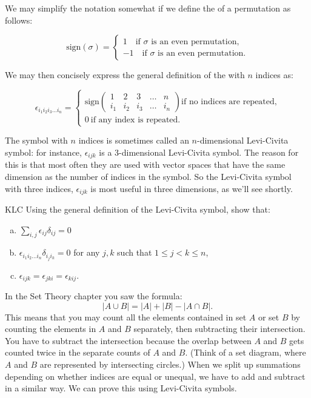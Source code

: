 We may simplify the notation somewhat if we define the  of a permutation as follows:

\[ \text{sign}(\sigma)=
\begin{cases}
1 \quad \text{if } \sigma \text{ is an even permutation,}\\
-1 \quad \text{if } \sigma \text{ is an even permutation.}
\end{cases} \]

We may then concisely express the general definition  of the  with $n$ indices as:

\[ \epsilon_{i_1 i_2 i_3 \ldots i_n}=
\begin{cases}
\text{sign} \left( \begin{smallmatrix} 1&2&3&\ldots&n \\ i_1&i_2&i_3 &\ldots&i_n \end{smallmatrix} \right) \text{if no indices are repeated,}\\
0 ~ \text{if any  index is repeated.}
\end{cases} \]

The symbol with $n$ indices is sometimes called an $n$-dimensional Levi-Civita symbol: for instance, $\epsilon_{ijk}$ is a 3-dimensional Levi-Civita symbol.  The reason for this is that most often they are used with vector spaces that have the same dimension as the number of indices in the symbol.  So   the Levi-Civita symbol with three indices, $\epsilon_{ijk}$ is most useful in three dimensions, as we'll see shortly.

\begin{exercise}{KLC}
Using  the general definition of the Levi-Civita symbol, show that:
\begin{enumerate}[(a)]
\item
$\displaystyle \sum_{i,j} \epsilon_{ij} \delta_{ij}=0$
\item
$ \epsilon_{i_1i_2\ldots i_n} \delta_{i_ji_k}=0$ for any $j,k$ such that $1 \le j < k \le n$,
\item
$\epsilon_{ijk} = \epsilon_{jki} = \epsilon_{kij}.$
\end{enumerate}
\end{exercise}

In the Set Theory chapter you saw the formula:
\[ |A \cup B| = |A| + |B| - |A \cap B|.\]
This means that you may count all the elements contained in set $A$ or set $B$ by counting the elements in $A$ and $B$ separately, then subtracting their intersection.  You have to  subtract the intersection because  the overlap between $A$ and $B$ gets counted twice in the separate counts of $A$ and $B$.  (Think of a set diagram, where $A$ and $B$ are represented by intersecting circles.)  When we split up summations depending on whether indices are equal or unequal, we have to add and subtract in a similar way. We can prove this using Levi-Civita symbols.
  
